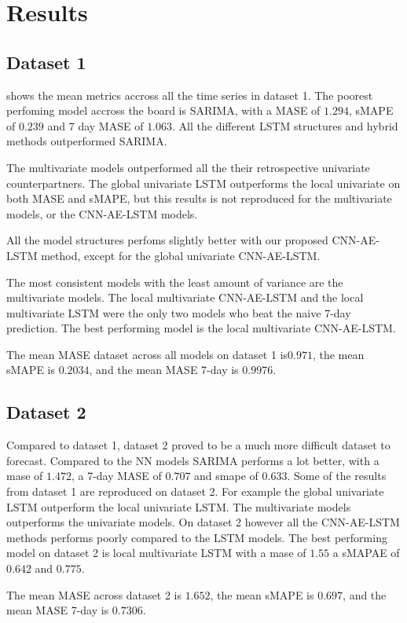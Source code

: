 \section{Results}
\subsection{Dataset 1}
 shows the mean metrics accross
all the time series in dataset 1. The poorest perfoming model accross the board
is SARIMA, with a MASE of $1.294$, sMAPE of $0.239$ and 7 day MASE of $1.063$.
All the different LSTM structures and hybrid methods outperformed SARIMA.

The multivariate models outperformed all the their retrospective univariate counterpartners.
The global univariate LSTM outperforms the local univariate on both MASE and sMAPE,
but this results is not reproduced for the multivariate models, or the CNN-AE-LSTM models.

All the model structures perfoms slightly better with our proposed CNN-AE-LSTM method, except for
the global univariate CNN-AE-LSTM.

The most consistent models with the least amount of variance are the multivariate models.
The local multivariate CNN-AE-LSTM and the local multivariate LSTM were the only two models
who beat the naive 7-day prediction. The best performing model is the local multivariate CNN-AE-LSTM.

The mean MASE dataset across all models on dataset 1 is$0.971$,
the mean sMAPE is $0.2034$,
and the mean MASE 7-day is $0.9976$.


\subsection{Dataset 2}
Compared to dataset 1, dataset 2 proved to be a much more difficult dataset to forecast.
Compared to the NN models SARIMA performs a lot better, with a mase of $1.472$, a 7-day MASE of $0.707$ and smape of $0.633$.
Some of the results from dataset 1 are reproduced on dataset 2. For example the global univariate LSTM outperform
the local univariate LSTM. The multivariate models outperforms the univariate models.
On dataset 2 however all the CNN-AE-LSTM methods performs poorly compared to the LSTM models.
The best performing model on dataset 2 is local multivariate LSTM with a mase of $1.55$ a sMAPAE of $0.642$
and $0.775$.

The mean MASE across dataset 2 is $1.652$,
the mean sMAPE is $0.697$,
and the mean MASE 7-day is  $0.7306$.

